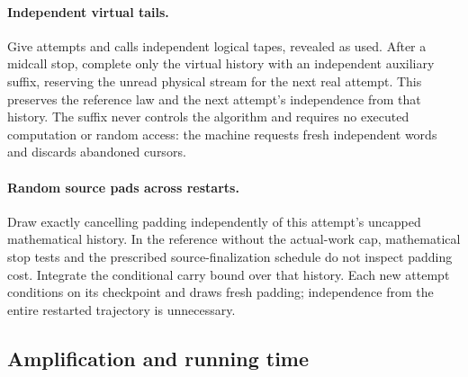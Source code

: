 \documentclass[11pt]{article}
\theoremstyle{remark}
\begin{document}
\paragraph{Independent virtual tails.}
Give attempts and calls independent logical tapes, revealed as used.
After a midcall stop, complete only the virtual history with an independent
auxiliary suffix, reserving the unread physical stream for the next real
attempt.
This preserves the reference law and the next attempt's independence from that
history.
The suffix never controls the algorithm and requires no executed computation or
random access: the machine requests fresh independent words and discards
abandoned cursors.

\paragraph{Random source pads across restarts.}
Draw exactly cancelling padding independently of this attempt's uncapped
mathematical history.
In the reference without the actual-work cap, mathematical stop tests and the
prescribed source-finalization schedule do not inspect padding cost.
Integrate the conditional carry bound over that history.
Each new attempt conditions on its checkpoint and draws fresh padding;
independence from the entire restarted trajectory is unnecessary.

\subsection{Amplification and running time}
\end{document}
